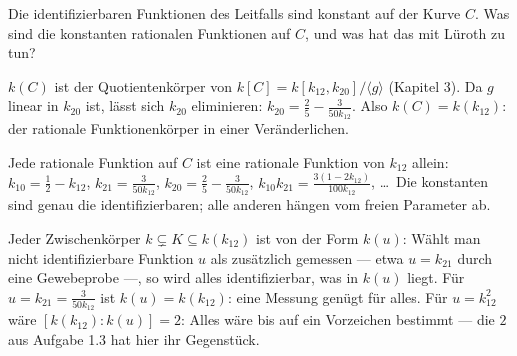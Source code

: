 \begin{aufgabe}
Die identifizierbaren Funktionen des Leitfalls sind konstant auf der Kurve $C$. Was sind die  konstanten rationalen Funktionen auf $C$, und was hat das mit Lüroth zu tun?

\loesung
{}
$k(C)$ ist der Quotientenkörper von $k[C] = k[k_{12}, k_{20}]/\langle g\rangle$ (Kapitel 3). Da $g$ linear in $k_{20}$ ist, lässt sich $k_{20}$ eliminieren: $k_{20} = \tfrac25 - \frac{3}{50k_{12}}$. Also $k(C) = k(k_{12})$: der rationale Funktionenkörper in einer Veränderlichen.

Jede rationale Funktion auf $C$ ist eine rationale Funktion von $k_{12}$ allein: $k_{10} = \tfrac12 - k_{12}$, $k_{21} = \frac{3}{50k_{12}}$, $k_{20} = \tfrac25 - \frac{3}{50k_{12}}$, $k_{10}k_{21} = \frac{3(1 - 2k_{12})}{100k_{12}}$, \ldots\ Die konstanten sind genau die identifizierbaren; alle anderen hängen vom freien Parameter ab.

Jeder Zwischenkörper $k\subsetneq K\subseteq k(k_{12})$ ist von der Form $k(u)$: Wählt man  nicht identifizierbare Funktion $u$ als zusätzlich gemessen --- etwa $u = k_{21}$ durch eine Gewebeprobe ---, so wird alles identifizierbar, was in $k(u)$ liegt. Für $u = k_{21} = \frac{3}{50k_{12}}$ ist $k(u) = k(k_{12})$: eine Messung genügt für alles. Für $u = k_{12}^{2}$ wäre $[k(k_{12}) : k(u)] = 2$: Alles wäre bis auf ein Vorzeichen bestimmt --- die $2$ aus Aufgabe 1.3 hat hier ihr Gegenstück.

\begin{center}
\begin{minipage}{0.88\textwidth}
\end{minipage}
\end{center}
\end{aufgabe}

